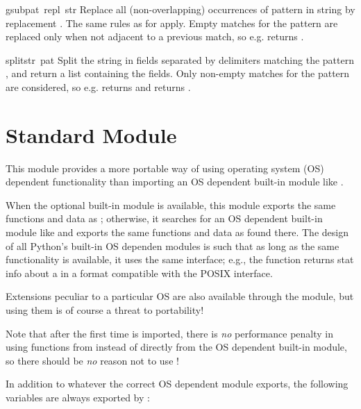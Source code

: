\begin{funcdesc}{gsub}{pat\, repl\, str}
Replace all (non-overlapping) occurrences of pattern  in
string  by replacement .  The same rules as for
 apply.  Empty matches for the pattern are replaced only
when not adjacent to a previous match, so e.g.
 returns .
\end{funcdesc}

\begin{funcdesc}{split}{str\, pat}
Split the string  in fields separated by delimiters matching
the pattern , and return a list containing the fields.  Only
non-empty matches for the pattern are considered, so e.g.
 returns \code{['a', 'b']} and
 returns \code{['abc']}.
\end{funcdesc}

\section{Standard Module }

This module provides a more portable way of using operating system
(OS) dependent functionality than importing an OS dependent built-in
module like .

When the optional built-in module  is available, this
module exports the same functions and data as ; otherwise,
it searches for an OS dependent built-in module like  and
exports the same functions and data as found there.  The design of all
Python's built-in OS dependen modules is such that as long as the same
functionality is available, it uses the same interface; e.g., the
function  returns stat info about a  in a
format compatible with the POSIX interface.

Extensions peculiar to a particular OS are also available through the
 module, but using them is of course a threat to portability!

Note that after the first time  is imported, there is \emph{no}
performance penalty in using functions from  instead of
directly from the OS dependent built-in module, so there should be
\emph{no} reason not to use !

In addition to whatever the correct OS dependent module exports, the
following variables are always exported by :

